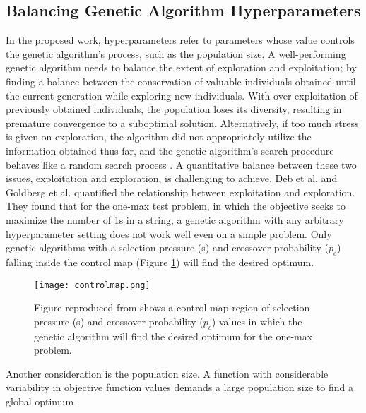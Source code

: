 \subsection{Balancing Genetic Algorithm Hyperparameters}
\label{sec:balance}
In the proposed work, hyperparameters refer to parameters whose value controls 
the genetic algorithm's process, such as the population size. 
A well-performing genetic algorithm needs to balance the extent of exploration and 
exploitation; by finding a balance between the conservation of 
valuable individuals obtained until the current generation while exploring new 
individuals. 
With over exploitation of previously obtained individuals, the population loses 
its diversity, resulting in premature convergence to a suboptimal solution. 
Alternatively, if too much stress is given on exploration, the algorithm did not 
appropriately utilize the information obtained thus far, and the genetic 
algorithm's search procedure behaves like a random search process 
\cite{deb_multi-objective_2001}. 
A quantitative balance between these two issues, exploitation and exploration, 
is challenging to achieve. 
Deb et al. \cite{deb_multi-objective_2001} and Goldberg et al. 
\cite{goldberg_toward_1993} quantified the relationship between exploitation 
and exploration. 
They found that for the one-max test problem, in which the objective seeks to 
maximize the number of 1s in a string, a genetic algorithm with any arbitrary 
hyperparameter setting does not work well even on a simple problem. 
Only genetic algorithms with a selection pressure (s) and crossover probability ($p_c$) 
falling inside the control map (Figure \ref{fig:controlmap}) will find the desired 
optimum.  
\begin{figure}[]
    \centering
    \texttt{[image: controlmap.png]} 
    \caption{Figure reproduced from \cite{goldberg_toward_1993,deb_multi-objective_2001}
    shows a control map region of selection pressure (s) and crossover probability ($p_c$)
    values in which the genetic algorithm will find the desired optimum for the 
    one-max problem.}
    \label{fig:controlmap}
\end{figure}
Another consideration is the population size. 
A function with considerable variability in objective function values demands 
a large population size to find a global optimum \cite{deb_multi-objective_2001}. 

